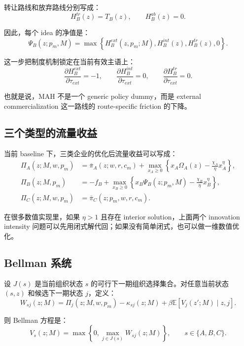 \documentclass[12pt]{ctexart}
\begin{document}
转让路线和放弃路线分别写成：
\[
H_B^{tr}(z)=T_B(z),
\qquad
H_B^{ab}(z)=0.
\]

因此，每个 idea 的净值是：
\begin{equation}
\Psi_B(z;p_m,M)
=
\max\left\{
H_B^{ext}(z,p_m;M),
H_B^{int}(z),
H_B^{tr}(z),
0
\right\}.
\label{eq:PsiB_note}
\end{equation}

这一步把制度机制锁定在当前有效主语上：
\[
\frac{\partial H_B^{ext}}{\partial \tau_{ext}}=-1,
\qquad
\frac{\partial H_B^{int}}{\partial \tau_{ext}}=0,
\qquad
\frac{\partial H_B^{tr}}{\partial \tau_{ext}}=0.
\]

也就是说，MAH 不是一个 generic policy dummy，而是 external commercialization 这一路线的 route-specific friction 的下降。

\subsection{三个类型的流量收益}

当前 baseline 下，三类企业的优化后流量收益可以写成：
\begin{align}
\Pi_A(z;M,w,p_m)
&=
\bar\pi_A(z;w,r,c_m)
+
\max_{x_A\ge 0}
\left\{
x_A\Omega_A(z)-\frac{\chi_A}{\eta}x_A^{\eta}
\right\},
\\
\Pi_B(z;M,p_m)
&=
-f_B+
\max_{x_B\ge 0}
\left\{
x_B\Psi_B(z;p_m,M)-\frac{\chi_B}{\eta}x_B^{\eta}
\right\},
\\
\Pi_C(z;M,w,p_m)
&=
\bar\pi_C(z;p_m,w,r,c_m).
\end{align}

在很多数值实现里，如果 $\eta>1$ 且存在 interior solution，上面两个 innovation intensity 问题可以先用闭式解代回；如果没有简单闭式，也可以做一维数值优化。

\subsection{Bellman 系统}

设 $J(s)$ 是当前组织状态 $s$ 的可行下一期组织选择集合。对任意当前状态 $(s,z)$ 和候选下一期状态 $j$，定义：
\begin{equation}
W_{sj}(z;M)
=
\Pi_j(z;M,w,p_m)-\kappa_{sj}(z;M)
+\beta \mathbb E\left[V_j(z';M)\mid z,j\right].
\label{eq:Wsj_note}
\end{equation}

则 Bellman 方程是：
\begin{equation}
V_s(z;M)
=
\max\left\{
0,
\max_{j\in J(s)}W_{sj}(z;M)
\right\},
\qquad s\in\{A,B,C\}.
\label{eq:Bellman_note}
\end{equation}
\end{document}
